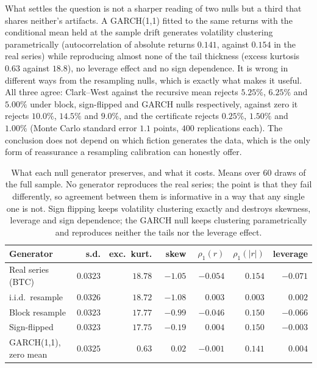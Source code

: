 \documentclass{article}
\theoremstyle{plain}
\theoremstyle{definition}
\begin{document}
What settles the question is not a sharper reading of two nulls but a third that shares
neither's artifacts. A GARCH(1,1) fitted to the same returns with the conditional mean held
at the sample drift generates volatility clustering parametrically (autocorrelation of
absolute returns $0.141$, against $0.154$ in the real series) while reproducing almost none of
the tail thickness (excess kurtosis $0.63$ against $18.8$), no leverage effect and no sign
dependence. It is wrong in different ways from the resampling nulls, which is exactly what
makes it useful. All three agree: Clark--West against the recursive mean rejects $5.25\%$,
$6.25\%$ and $5.00\%$ under block, sign-flipped and GARCH nulls respectively, against zero it
rejects $10.0\%$, $14.5\%$ and $9.0\%$, and the certificate rejects $0.25\%$, $1.50\%$ and
$1.00\%$ (Monte Carlo standard error $1.1$ points, $400$ replications each). The conclusion
does not depend on which fiction generates the data, which is the only form of reassurance a
resampling calibration can honestly offer.

\begin{table}[t]
  \centering
  \caption{What each null generator preserves, and what it costs. Means over 60 draws of the
  full sample. No generator reproduces the real series; the point is that they fail
  differently, so agreement between them is informative in a way that any single one is not.
  Sign flipping keeps volatility clustering exactly and destroys skewness, leverage and sign
  dependence; the GARCH null keeps clustering parametrically and reproduces neither the tails
  nor the leverage effect.}
  \label{tab:nulls}
  \small
  \setlength{\tabcolsep}{4pt}
  \begin{tabular}{lrrrrrr}
    \toprule
    Generator & s.d. & exc.\ kurt. & skew & $\rho_1(r)$ & $\rho_1(|r|)$ & leverage \\
    \midrule
    Real series (BTC)      & $0.0323$ & $18.78$ & $-1.05$ & $-0.054$ & $0.154$ & $-0.071$ \\
    i.i.d.\ resample       & $0.0326$ & $18.72$ & $-1.08$ & $\phantom{-}0.003$ & $0.003$ & $\phantom{-}0.002$ \\
    Block resample         & $0.0323$ & $17.77$ & $-0.99$ & $-0.046$ & $0.150$ & $-0.066$ \\
    Sign-flipped           & $0.0323$ & $17.75$ & $-0.19$ & $\phantom{-}0.004$ & $0.150$ & $-0.003$ \\
    GARCH(1,1), zero mean  & $0.0325$ & $\phantom{0}0.63$ & $\phantom{-}0.02$ & $-0.001$ & $0.141$ & $\phantom{-}0.004$ \\
    \bottomrule
  \end{tabular}
\end{table}
\end{document}

